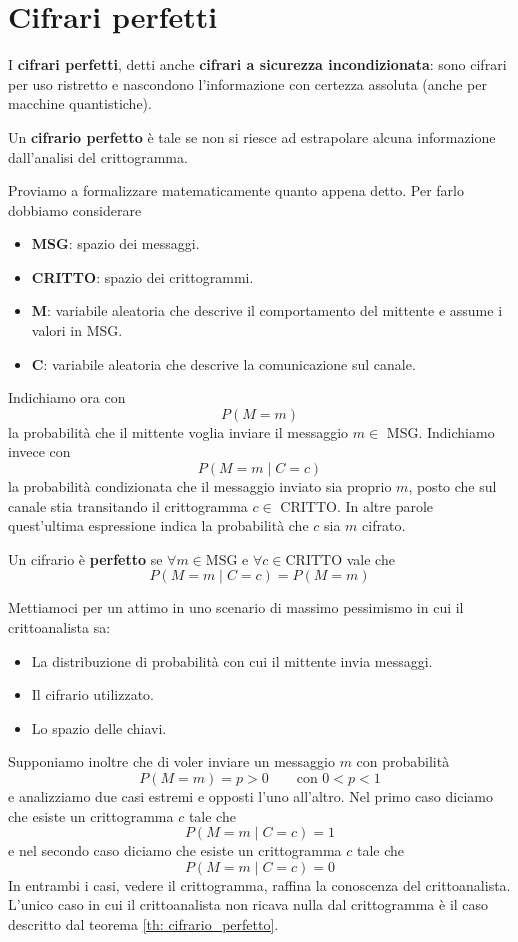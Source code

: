 \chapter{Cifrari perfetti}\label{perfetti}
I \textbf{cifrari perfetti}, detti anche \textbf{cifrari a sicurezza incondizionata}: sono cifrari per uso ristretto e
nascondono l'informazione con certezza assoluta (anche per macchine quantistiche).

Un \textbf{cifrario perfetto} \`e tale se non si riesce ad estrapolare alcuna informazione dall'analisi del crittogramma.

Proviamo a formalizzare matematicamente quanto appena detto. Per farlo dobbiamo considerare
\begin{itemize}
	\item \textbf{MSG}: spazio dei messaggi.
	\item \textbf{CRITTO}: spazio dei crittogrammi.
	\item \textbf{M}: variabile aleatoria che descrive il comportamento del	mittente e assume i valori in MSG.
	\item \textbf{C}: variabile aleatoria che descrive la comunicazione sul canale.
\end{itemize}
Indichiamo ora con
\[ P(M = m) \]
la probabilit\`a che il mittente voglia inviare il messaggio $m \in$ MSG. Indichiamo invece con
\[ P(M = m \mid C = c) \]
la probabilit\`a condizionata che il messaggio inviato sia proprio $m$, posto che sul canale stia transitando il
crittogramma $c \in$ CRITTO. In altre parole quest'ultima espressione indica la probabilit\`a che $c$ sia $m$ cifrato.

\begin{theorem}\label{th: cifrario_perfetto}
	Un cifrario \`e \textbf{perfetto} se $\forall m \in \text{MSG}$ e $\forall c \in \text{CRITTO}$ vale che
	\[ P(M = m \mid C = c) = P(M = m) \]
\end{theorem}

\begin{example}
	Mettiamoci per un attimo in uno scenario di massimo pessimismo in cui il crittoanalista sa:
	\begin{itemize}
		\item La distribuzione di probabilit\`a con cui il mittente invia messaggi.
		\item Il cifrario utilizzato.
		\item Lo spazio delle chiavi.
	\end{itemize}
	Supponiamo inoltre che di voler inviare un messaggio $m$ con probabilit\`a
	\[ P(M = m) = p > 0 \quad \quad \text{con } 0 < p < 1 \]
	e analizziamo due casi estremi e opposti l'uno all'altro. Nel primo caso diciamo che esiste un crittogramma $c$ tale
	che
	\[ P(M = m \mid C = c) = 1 \]
	e nel secondo caso diciamo che esiste un crittogramma $c$ tale che
	\[ P(M = m \mid C = c) = 0 \]
	In entrambi i casi, vedere il crittogramma, raffina la conoscenza del crittoanalista. L'unico caso in cui il
	crittoanalista non ricava nulla dal crittogramma \`e il caso descritto dal teorema \ref{th: cifrario_perfetto}.
\end{example}

